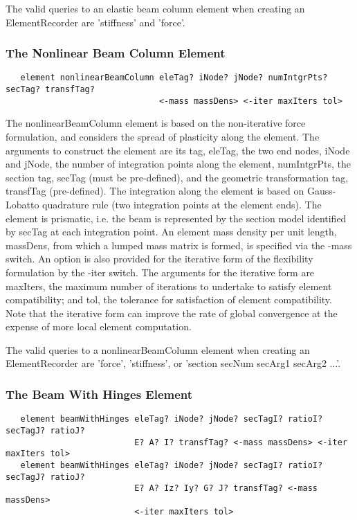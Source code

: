 \documentclass[12pt]{article}
\begin{document}
The valid queries to an elastic beam column element when creating an
ElementRecorder are 'stiffness' and 'force'.

\subsubsection{The Nonlinear Beam Column Element}
{\sf\small
\begin{verbatim}
   element nonlinearBeamColumn eleTag? iNode? jNode? numIntgrPts? secTag? transfTag?
                               <-mass massDens> <-iter maxIters tol> 
\end{verbatim}
}

\noindent The nonlinearBeamColumn element is based on the
non-iterative force formulation, and considers the spread of
plasticity along the element. The arguments to construct the element
are its tag, eleTag, the two end nodes, iNode and jNode, the number of
integration points along the element, numIntgrPts, the section tag,
secTag (must be pre-defined), and the geometric transformation tag,
transfTag (pre-defined). The integration along the element is based on
Gauss-Lobatto quadrature rule (two integration points at the element
ends). The element is prismatic, i.e. the beam is represented by the
section  model identified by secTag at each integration point. An
element mass density per unit length, massDens, from which a lumped
mass matrix is formed, is specified via the -mass switch. An option is
also provided for the iterative form of the flexibility formulation by
the -iter switch. The arguments for the iterative form are maxIters,
the maximum number of iterations to undertake to satisfy element
compatibility; and tol, the tolerance for satisfaction of element
compatibility. Note that the iterative form can improve the rate of
global convergence at the expense of more local element computation. 

The valid queries to a nonlinearBeamColumn element when creating an
ElementRecorder are 'force', 'stiffness', or 'section secNum secArg1 secArg2 ...'.

\subsubsection{The Beam With Hinges Element}
{\sf\small
\begin{verbatim}
   element beamWithHinges eleTag? iNode? jNode? secTagI? ratioI? secTagJ? ratioJ?
                          E? A? I? transfTag? <-mass massDens> <-iter maxIters tol> 
   element beamWithHinges eleTag? iNode? jNode? secTagI? ratioI? secTagJ? ratioJ?
                          E? A? Iz? Iy? G? J? transfTag? <-mass massDens>
                          <-iter maxIters tol> 
\end{verbatim}
}
\end{document}
